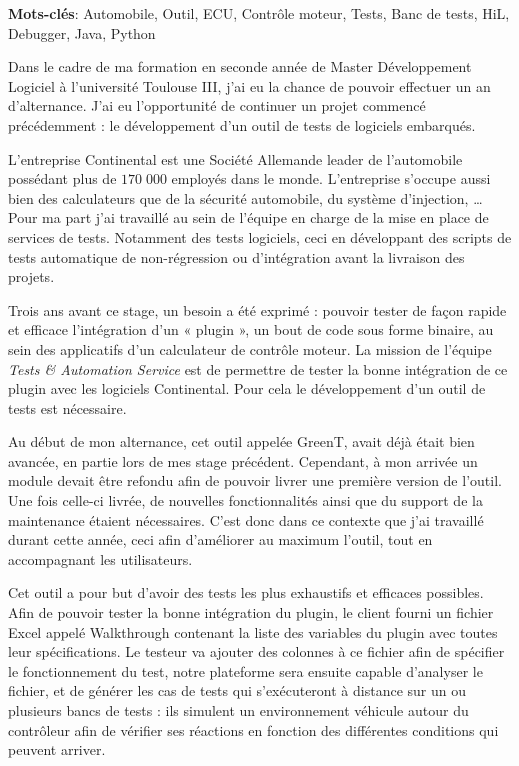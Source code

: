 \vspace{-45px}
\footnotesize{\textbf{Mots-clés}: Automobile, Outil, ECU, Contrôle moteur, Tests, Banc de tests, HiL, Debugger, Java, Python}

\normalsize
Dans le cadre de ma formation en seconde année de Master Développement Logiciel à l'université
Toulouse III, j'ai eu la chance de pouvoir effectuer un an d'alternance. J'ai eu l'opportunité de continuer un projet commencé précédemment : le développement
d'un outil de tests de logiciels embarqués.

L'entreprise Continental est une Société Allemande leader de l'automobile possédant plus de $170\;000$
employés dans le monde. L'entreprise s'occupe aussi bien des calculateurs que de la sécurité automobile,
du système d'injection, \ldots\newline
Pour ma part j'ai travaillé au sein de l'équipe en charge de la mise en place de services de tests.
Notamment des tests logiciels, ceci en développant des scripts de tests automatique de non-régression
ou d'intégration avant la livraison des projets.

Trois ans avant ce stage, un besoin a été exprimé : pouvoir tester de façon rapide et efficace
l'intégration d'un « plugin », un bout de code sous forme binaire, au sein des applicatifs d'un calculateur de contrôle moteur. La mission de l'équipe \textit{Tests \& Automation Service} est de permettre
de tester la bonne intégration de ce plugin avec les logiciels Continental. Pour cela le développement
d'un outil de tests est nécessaire.

Au début de mon alternance, cet outil appelée GreenT, avait déjà était bien avancée, en partie lors de mes stage
précédent. Cependant, à mon arrivée un module devait être refondu afin de pouvoir livrer une première version de l'outil. Une fois celle-ci livrée, de nouvelles
fonctionnalités ainsi que du support de la maintenance étaient nécessaires. C'est donc dans ce contexte que j'ai
travaillé durant cette année, ceci afin d'améliorer au maximum l'outil, tout en accompagnant les utilisateurs.

Cet outil a pour but d'avoir des tests les plus exhaustifs et efficaces possibles. Afin de pouvoir
tester la bonne intégration du plugin, le client fourni un fichier Excel appelé Walkthrough contenant
la liste des variables du plugin avec toutes leur spécifications. Le testeur va ajouter des colonnes à ce
fichier afin de spécifier le fonctionnement du test, notre plateforme sera ensuite capable d'analyser
le fichier, et de générer les cas de tests qui s'exécuteront à distance sur un ou plusieurs bancs de
tests : ils simulent un environnement véhicule autour du contrôleur afin de vérifier ses réactions en
fonction des différentes conditions qui peuvent arriver.

